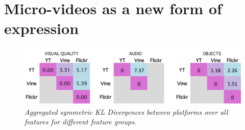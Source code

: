 
\section{Micro-videos as a new form of expression}







\label{sec:new-vine-old-bottle}

\vspace{-2mm}
\begin{figure}[!htb]
\centering
\includegraphics[width=\columnwidth]{plots/comparison/table}
\caption{\textsl{ Aggregated symmetric KL Divergences between platforms over all features for different feature groups.}}
	\label{fig:comparisontable}
	\vspace{-2mm}

\end{figure}


